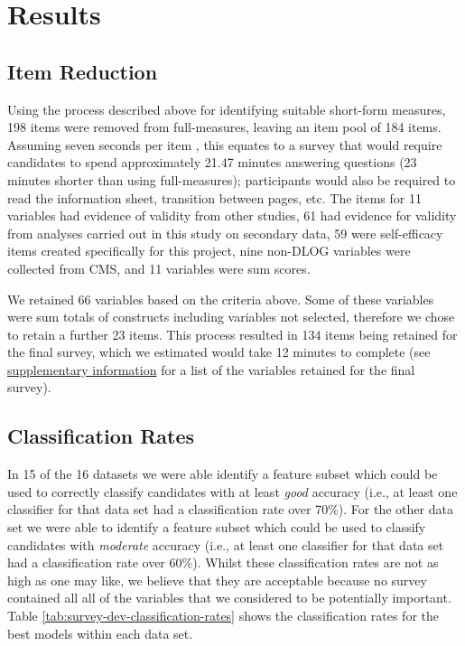 \documentclass[
  12pt,
  a4paper,
]{book}
\begin{document}
\hypertarget{survey-tool-dev-results}{%
\section{Results}\label{survey-tool-dev-results}}

\hypertarget{item-reduction}{%
\subsection{Item Reduction}\label{item-reduction}}

Using the process described above for identifying suitable short-form measures, 198 items were removed from full-measures, leaving an item pool of 184 items. Assuming seven seconds per item \citep{Qualtrics}, this equates to a survey that would require candidates to spend approximately 21.47 minutes answering questions (23 minutes shorter than using full-measures); participants would also be required to read the information sheet, transition between pages, etc. The items for 11 variables had evidence of validity from other studies, 61 had evidence for validity from analyses carried out in this study on secondary data, 59 were self-efficacy items created specifically for this project, nine non-DLOG variables were collected from CMS, and 11 variables were sum scores.

We retained 66 variables based on the criteria above. Some of these variables were sum totals of constructs including variables not selected, therefore we chose to retain a further 23 items. This process resulted in 134 items being retained for the final survey, which we estimated would take 12 minutes to complete (see \protect\hyperlink{survey-items}{supplementary information} for a list of the variables retained for the final survey).

\hypertarget{survey-tool-dev-classificaiton-rates}{%
\subsection{Classification Rates}\label{survey-tool-dev-classificaiton-rates}}

In 15 of the 16 datasets we were able identify a feature subset which could be used to correctly classify candidates with at least \emph{good} accuracy (i.e., at least one classifier for that data set had a classification rate over 70\%). For the other data set we were able to identify a feature subset which could be used to classify candidates with \emph{moderate} accuracy (i.e., at least one classifier for that data set had a classification rate over 60\%). Whilst these classification rates are not as high as one may like, we believe that they are acceptable because no survey contained all all of the variables that we considered to be potentially important. Table \ref{tab:survey-dev-classification-rates} shows the classification rates for the best models within each data set.
\end{document}
